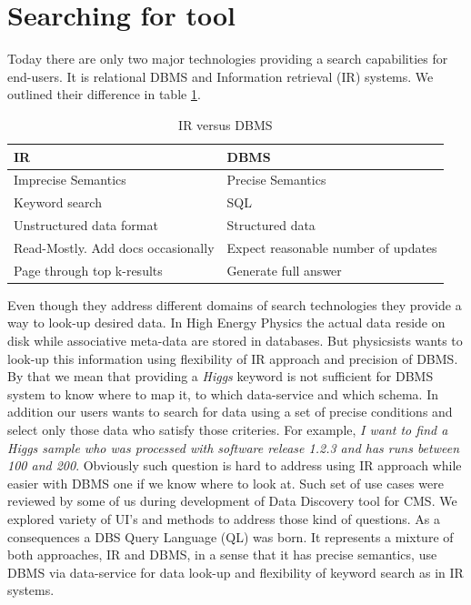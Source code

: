 \documentclass[a4paper]{jpconf}
\begin{document}
\section{Searching for tool}
Today there are only two major technologies providing a search capabilities
for end-users. It is relational DBMS and Information retrieval (IR) systems.
We outlined their difference in table \ref{IR_DBMS}.

\begin{table}[hbt]
\centering
\begin{tabular}{ll}\hline\hline

IR & DBMS \\
\hline
Imprecise Semantics & Precise Semantics \\
Keyword search & SQL \\
Unstructured data format & Structured data \\
Read-Mostly.  Add docs occasionally & Expect reasonable number of updates \\
Page through top k-results & Generate full answer \\
\hline
\end{tabular}
\caption{IR versus DBMS}
\label{IR_DBMS}
\end{table}

Even though they address different domains of search technologies they
provide a way to look-up desired data. In High Energy Physics the actual data
reside on disk while associative meta-data are stored in databases.
But physicsists wants to look-up this information using flexibility of
IR approach and precision of DBMS. By that we mean that providing a {\it Higgs}
keyword is not sufficient for DBMS system to know where to map it,
to which data-service and which schema. In addition our users wants
to search for data using a set of precise conditions and select only those
data who satisfy those criteries. For example,
{\it I want to find a Higgs sample who was processed with software release
1.2.3 and has runs between 100 and 200}. Obviously such question is
hard to address using IR approach while easier with DBMS one if we know
where to look at. Such set of use cases were reviewed by some of us
\cite{DBS07} during development of Data Discovery tool for CMS. We explored
variety of UI's and methods to address those kind of questions. As a
consequences a DBS Query Language (QL) was born. It represents a mixture
of both approaches, IR and DBMS, in a sense that it has precise
semantics, use DBMS via data-service for data look-up and flexibility of
keyword search as in IR systems.
\end{document}
